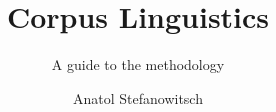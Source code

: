 \author{Anatol Stefanowitsch}
\title{Corpus Linguistics}
\subtitle{A guide to the methodology}
\renewcommand{\lsSeries}{tbls}
\renewcommand{\lsSeriesNumber}{8}
